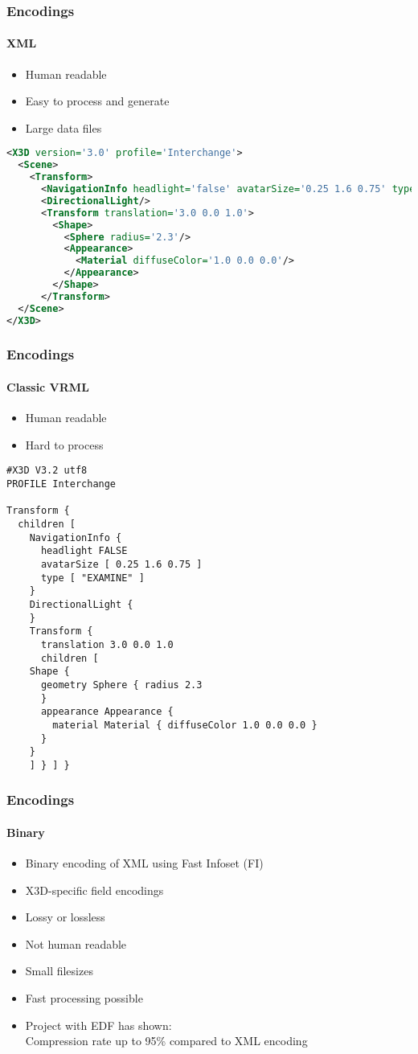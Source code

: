 \documentclass[t]{beamer}
\begin{document}
\begin{frame}[fragile]
\frametitle{Encodings}
\framesubtitle{XML}
\begin{itemize}
  \item Human readable
  \item Easy to process and generate
  \item Large data files
\end{itemize}
\begin{lstlisting}[language={xml}]
<X3D version='3.0' profile='Interchange'>
  <Scene>
    <Transform>
      <NavigationInfo headlight='false' avatarSize='0.25 1.6 0.75' type='"EXAMINE"'/>
      <DirectionalLight/>
      <Transform translation='3.0 0.0 1.0'>
        <Shape>
          <Sphere radius='2.3'/>
          <Appearance>
            <Material diffuseColor='1.0 0.0 0.0'/>
          </Appearance>
        </Shape>
      </Transform>
  </Scene>
</X3D>
  \end{lstlisting}

\end{frame}
  
  \begin{frame}[fragile]
\frametitle{Encodings}
  \framesubtitle{Classic VRML}
\begin{itemize}
  \item Human readable
  \item Hard to process
  \end{itemize}
\begin{lstlisting}[language={VRML}]
#X3D V3.2 utf8
PROFILE Interchange

Transform {
  children [
    NavigationInfo {
      headlight FALSE
      avatarSize [ 0.25 1.6 0.75 ]
      type [ "EXAMINE" ]
    }
    DirectionalLight {
    }
    Transform {
      translation 3.0 0.0 1.0
      children [
    Shape {
	  geometry Sphere { radius 2.3
	  }
	  appearance Appearance {
	    material Material { diffuseColor 1.0 0.0 0.0 }
	  }
	}
    ] } ] }
\end{lstlisting}

\end{frame}
  
  \begin{frame}[t]
\frametitle{Encodings}
  \framesubtitle{Binary}
\begin{itemize}
  \item Binary encoding of XML using Fast Infoset (FI)
  \item X3D-specific field encodings
  \item Lossy or lossless
  \item Not human readable
  \item Small filesizes
  \item Fast processing possible
  \item Project with EDF has shown: \\ Compression rate up to 95\% compared to
  XML encoding 
  \end{itemize}
  \end{frame}
  
\end{document}
